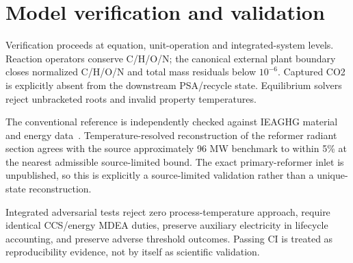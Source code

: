 \section{Model verification and validation}
Verification proceeds at equation, unit-operation and integrated-system levels. Reaction operators conserve C/H/O/N; the canonical external plant boundary closes normalized C/H/O/N and total mass residuals below $10^{-6}$. Captured CO2 is explicitly absent from the downstream PSA/recycle state. Equilibrium solvers reject unbracketed roots and invalid property temperatures.

The conventional reference is independently checked against IEAGHG material and energy data~\cite{ieaghg2017smr}. Temperature-resolved reconstruction of the reformer radiant section agrees with the source approximately 96 MW benchmark to within 5\% at the nearest admissible source-limited bound. The exact primary-reformer inlet is unpublished, so this is explicitly a source-limited validation rather than a unique-state reconstruction.

Integrated adversarial tests reject zero process-temperature approach, require identical CCS/energy MDEA duties, preserve auxiliary electricity in lifecycle accounting, and preserve adverse threshold outcomes. Passing CI is treated as reproducibility evidence, not by itself as scientific validation.
